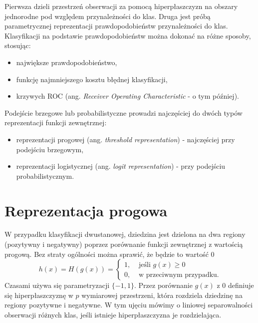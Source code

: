\documentclass[]{book}
\providecommand{\tightlist}{%
  \setlength{\itemsep}{0pt}\setlength{\parskip}{0pt}}
\theoremstyle{plain}
\theoremstyle{definition}
\theoremstyle{definition}
\theoremstyle{definition}
\theoremstyle{definition}
\theoremstyle{remark}
\begin{document}
Pierwsza dzieli przestrzeń obserwacji za pomocą hiperpłaszczyzn na obszary jednorodne pod względem przynależności do klas. Druga jest próbą parametrycznej reprezentacji prawdopodobieństw przynależności do klas. Klasyfikacji na podstawie prawdopodobieństw można dokonać na różne sposoby, stosując:

\begin{itemize}
\tightlist
\item
  największe prawdopodobieństwo,
\item
  funkcję najmniejszego kosztu błędnej klasyfikacji,
\item
  krzywych ROC (ang. \emph{Receiver Operating Characteristic} - o tym później).
\end{itemize}

Podejście brzegowe lub probabilistyczne prowadzi najczęściej do dwóch typów reprezentacji funkcji zewnętrznej:

\begin{itemize}
\tightlist
\item
  reprezentacji progowej (ang. \emph{threshold representation}) - najczęściej przy podejściu brzegowym,
\item
  reprezentacji logistycznej (ang. \emph{logit representation}) - przy podejściu probabilistycznym.
\end{itemize}

\hypertarget{reprezentacja-progowa}{%
\section{Reprezentacja progowa}\label{reprezentacja-progowa}}

W przypadku klasyfikacji dwustanowej, dziedzina jest dzielona na dwa regiony (pozytywny i negatywny) poprzez porównanie funkcji zewnętrznej z wartością progową. Bez straty ogólności można sprawić, że będzie to wartość 0
\begin{equation}
    h(x)=H(g(x))= \begin{cases}
        1, &\text{ jeśli } g(x)\geq 0\\
        0, &\text{ w przeciwnym przypadku.}
    \end{cases}
\end{equation}
Czasami używa się parametryzacji \(\{-1,1\}\).
Przez porównanie \(g(x)\) z 0 definiuje się hiperpłaszczyznę w \(p\) wymiarowej przestrzeni, która rozdziela dziedzinę na regiony pozytywne i negatywne. W tym ujęciu mówimy o liniowej separowalności obserwacji różnych klas, jeśli istnieje hiperpłaszczyzna je rozdzielająca.
\end{document}
